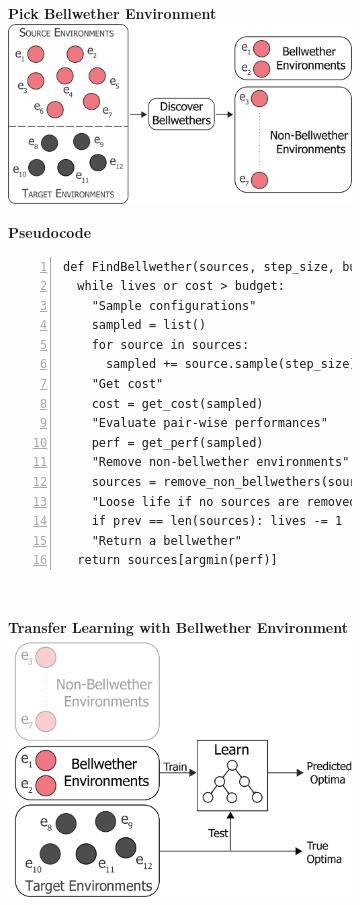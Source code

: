 \begin{figure}[htbp]
\centering
\begin{subfigure}[t]{0.45\linewidth}
\centering
\textbf{Pick Bellwether Environment}\\[0.5cm]
\includegraphics[width=\linewidth]{figures/source_target.png}
\end{subfigure}\hspace{5pt}
\begin{subfigure}[t]{0.5\linewidth}
\hspace{0.4\linewidth}\textbf{Pseudocode}
\small
\begin{lstlisting}[xleftmargin=8.0ex,mathescape,frame=none,numbers=left]
def FindBellwether(sources, step_size, budget, thres, lives): 
  while lives or cost > budget:
    "Sample configurations"
    sampled = list()
    for source in sources:
      sampled += source.sample(step_size)
    "Get cost"
    cost = get_cost(sampled)
    "Evaluate pair-wise performances"
    perf = get_perf(sampled)
    "Remove non-bellwether environments"
    sources = remove_non_bellwethers(sources, perf, thres)
    "Loose life if no sources are removed"
    if prev == len(sources): lives -= 1
    "Return a bellwether"
  return sources[argmin(perf)]
\end{lstlisting}
\end{subfigure}\\[0.4cm]
\begin{subfigure}[t]{0.5\linewidth}
\centering
\textbf{Transfer Learning with Bellwether Environment}\\
\includegraphics[width=0.85\linewidth]{figures/bellwether-transfer.png}

\end{subfigure}
\end{figure}
